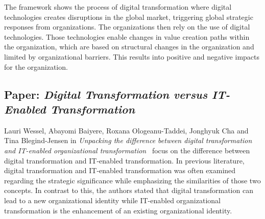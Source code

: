 \documentclass[a4]{scrartcl}
\begin{document}
The framework shows the process of digital transformation where digital technologies creates disruptions in the global market, triggering global strategic responses from organizations. The organizations then rely on the use of digital technologies. Those technologies enable changes in value creation paths within the organization, which are based on structural changes in the organization and limited by organizational barriers. This results into positive and negative impacts for the organization.~\cite{vial}










	





\subsection{Paper: \textit{Digital Transformation versus IT-Enabled Transformation}} \label{DTOT}	

Lauri Wessel, Abayomi Baiyere, Roxana Ologeanu-Taddei, Jonghyuk Cha and Tina Blegind-Jensen in \textit{Unpacking the difference between digital transformation and IT-enabled organizational transformation}~\cite{DTOT} focus on the difference between digital transformation and IT-enabled transformation. In previous literature, digital transformation and IT-enabled transformation was often examined regarding the strategic significance while emphasizing the similarities of those two concepts. 
In contrast to this, the authors stated that digital transformation can lead to a new organizational identity while IT-enabled organizational transformation is the enhancement of an existing organizational identity.~\cite{DTOT}
	
\end{document}

